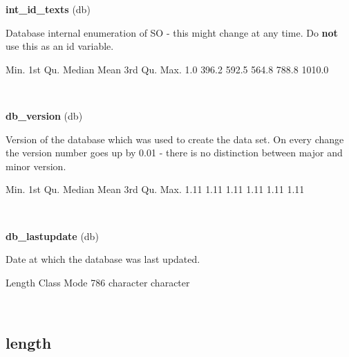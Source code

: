 \documentclass[]{article}
\newenvironment{Shaded}{\begin{snugshade}}{\end{snugshade}}
\newcommand{\DecValTok}[1]{\textcolor[rgb]{0.00,0.00,0.81}{{#1}}}
\newcommand{\FloatTok}[1]{\textcolor[rgb]{0.00,0.00,0.81}{{#1}}}
\newcommand{\NormalTok}[1]{{#1}}
\begin{document}
\vspace{1em}

\textbf{int\_id\_texts} (db)

Database internal enumeration of SO - this might change at any time. Do
\textbf{not} use this as an id variable.

\begin{Shaded}
\begin{Highlighting}[]
   \NormalTok{Min. 1st Qu.  Median    Mean 3rd Qu.    Max. }
    \FloatTok{1.0}   \FloatTok{396.2}   \FloatTok{592.5}   \FloatTok{564.8}   \FloatTok{788.8}  \FloatTok{1010.0} 
\end{Highlighting}
\end{Shaded}

~

\vspace{1em}

\textbf{db\_version} (db)

Version of the database which was used to create the data set. On every
change the version number goes up by 0.01 - there is no distinction
between major and minor version.

\begin{Shaded}
\begin{Highlighting}[]
   \NormalTok{Min. 1st Qu.  Median    Mean 3rd Qu.    Max. }
   \FloatTok{1.11}    \FloatTok{1.11}    \FloatTok{1.11}    \FloatTok{1.11}    \FloatTok{1.11}    \FloatTok{1.11} 
\end{Highlighting}
\end{Shaded}

~

\vspace{1em}

\textbf{db\_lastupdate} (db)

Date at which the database was last updated.

\begin{Shaded}
\begin{Highlighting}[]
   \NormalTok{Length     Class      Mode }
      \DecValTok{786} \NormalTok{character character }
\end{Highlighting}
\end{Shaded}

~

\vspace{1em}

\subsection{length}\label{length}
\end{document}
